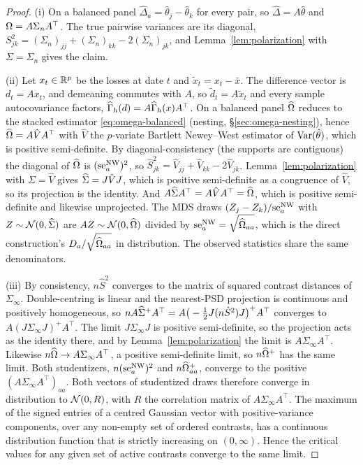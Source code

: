 \begin{proof}
(i) On a balanced panel $\hat\Delta_a=\hat\theta_j-\hat\theta_k$ for every pair, so
$\hat\Delta=A\hat\theta$ and $\Omega=A\Sigma_nA^\top$. The true pairwise variances
are its diagonal, $S^2_{jk}=(\Sigma_n)_{jj}+(\Sigma_n)_{kk}-2(\Sigma_n)_{jk}$, and
Lemma~\ref{lem:polarization} with $\Sigma=\Sigma_n$ gives the claim.

(ii) Let $x_t\in\mathbb{R}^p$ be the losses at date $t$ and $\tilde x_t=x_t-\bar x$. The
difference vector is $d_t=Ax_t$, and demeaning commutes with $A$, so
$\tilde d_t=A\tilde x_t$ and every sample autocovariance factors,
$\widehat{\Gamma}_h(d)=A\widehat{\Gamma}_h(x)A^\top$. On a balanced panel $\widehat{\Omega}$ reduces to the
stacked estimator \eqref{eq:omega-balanced} (nesting, \S\ref{sec:omega-nesting}), hence
$\widehat{\Omega}=A\hat VA^\top$ with $\hat V$ the $p$-variate Bartlett Newey--West estimator of
$\operatorname{Var}(\hat\theta)$, which is positive semi-definite. By diagonal-consistency (the
supports are contiguous) the diagonal of $\widehat{\Omega}$ is $(\mathrm{se}^{\mathrm{NW}}_{a})^2$, so
$\hat S^2_{jk}=\hat V_{jj}+\hat V_{kk}-2\hat V_{jk}$. Lemma~\ref{lem:polarization} with
$\Sigma=\hat V$ gives $\widehat{\Sigma}=J\hat VJ$, which is positive semi-definite as a congruence of
$\hat V$, so its projection is the identity. And $A\widehat{\Sigma} A^\top=A\hat VA^\top=\widehat{\Omega}$,
which is positive semi-definite and likewise unprojected. The MDS draws
$(Z_j-Z_k)/\mathrm{se}^{\mathrm{NW}}_{a}$ with $Z\sim\mathcal{N}(0,\widehat{\Sigma})$ are $AZ\sim\mathcal{N}(0,\widehat{\Omega})$
divided by $\mathrm{se}^{\mathrm{NW}}_{a}=\sqrt{\widehat{\Omega}_{aa}}$, which is the direct construction's
$D_a/\sqrt{\widehat{\Omega}_{aa}}$ in distribution. The observed statistics share the same
denominators.

(iii) By consistency, $n\hat S^2$ converges to the matrix of squared contrast distances
of $\Sigma_\infty$. Double-centring is linear and the nearest-PSD projection is
continuous and positively homogeneous, so $nA\widehat{\Sigma}^{+}A^\top=A\big(-\tfrac12 J(n\hat S^2)J
\big)^{+}A^\top$ converges to $A(J\Sigma_\infty J)^{+}A^\top$. The limit $J\Sigma_\infty
J$ is positive semi-definite, so the projection acts as the identity there, and by
Lemma~\ref{lem:polarization} the limit is $A\Sigma_\infty A^\top$. Likewise
$n\widehat{\Omega}\to A\Sigma_\infty A^\top$, a positive semi-definite limit, so
$n\widehat{\Omega}^{+}$ has the same limit. Both studentizers, $n(\mathrm{se}^{\mathrm{NW}}_{a})^2$ and
$n\widehat{\Omega}^{+}_{aa}$, converge to the positive $(A\Sigma_\infty A^\top)_{aa}$. Both
vectors of studentized draws therefore converge in distribution to $\mathcal{N}(0,R)$, with
$R$ the correlation matrix of $A\Sigma_\infty A^\top$. The maximum of the signed entries
of a centred Gaussian vector with positive-variance components, over any non-empty set
of ordered contrasts, has a continuous distribution function that is strictly increasing
on $(0,\infty)$. Hence the critical values for any given set of active contrasts converge
to the same limit.
\end{proof}

